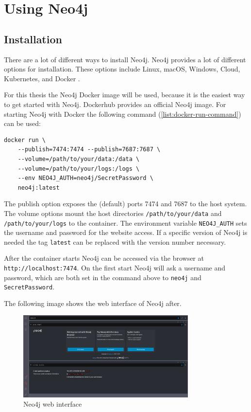\section{Using Neo4j}

\subsection{Installation}
There are a lot of different ways to install Neo4j. Neo4j provides a lot of
different options for installation. These options include Linux, macOS, Windows, Cloud,
Kubernetes, and Docker \parencite{neo4j:installation}.

For this thesis the Neo4j Docker image will be used, because it is the easiest
way to get started with Neo4j. Dockerhub provides an official Neo4j image. For
starting Neo4j with Docker the following command (\autoref{list:docker-run-command}) can be used:
\begin{lstlisting}[caption=Neo4j docker run command,label=list:docker-run-command,basicstyle=\ttfamily]
docker run \
    --publish=7474:7474 --publish=7687:7687 \
    --volume=/path/to/your/data:/data \
    --volume=/path/to/your/logs:/logs \ 
    --env NEO4J_AUTH=neo4j/SecretPassword \
    neo4j:latest
\end{lstlisting}
The publish option exposes the (default) ports 7474 and 7687 to the host system.
The volume options mount the host directories \texttt{/path/to/your/data} and
\texttt{/path/to/your/logs} to the container. The environment variable
\texttt{NEO4J\_AUTH} sets the username and password for the website access. If a
specific version of Neo4j is needed the tag \texttt{latest} can be replaced with
the version number necessary.

After the container starts Neo4j can be accessed via the browser at
\texttt{http://localhost:7474}. On the first start Neo4j will ask a username and
password, which are both set in the command above to \texttt{neo4j} and
\texttt{SecretPassword}.

The following image shows the web interface of Neo4j after.
\begin{figure}[ht]
    \centering
    \includegraphics[width=0.8\textwidth]{images/neo4j-web-interface.png}
    \caption{Neo4j web interface}
    \label{fig:neo4j-web-interface}
\end{figure}

